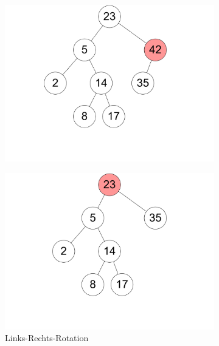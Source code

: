 \documentclass[11pt,a4paper]{article}
\begin{document}
\begin{loesung}
\begin{enumerate}
\begin{figure}[h!]
\begin{subfigure}[b]{0.23\textwidth}
                \includegraphics[width=\textwidth]{img/3a_17}
                \caption*{}
            \end{subfigure}
            \begin{subfigure}[b]{0.23\textwidth}
                \centering
                \includegraphics[width=\textwidth]{img/3a_18}
                \caption*{Links-Rechts-Rotation}
            \end{subfigure}
            \begin{subfigure}[b]{0.23\textwidth}
                \centering

\end{subfigure}
\end{figure}
\end{enumerate}
\end{loesung}
\end{document}
